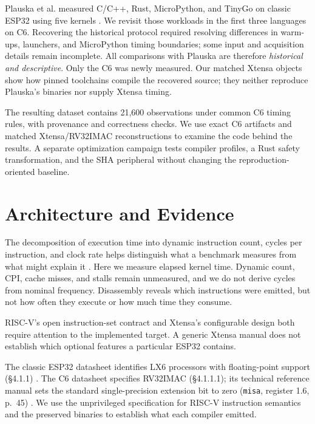 \documentclass[10pt]{article}
\begin{document}
Plauska et al. measured C/C++, Rust, MicroPython, and TinyGo on classic ESP32 using five kernels \citep{plauska2023performance}. We revisit those workloads in the first three languages on C6. Recovering the historical protocol required resolving differences in warm-ups, launchers, and MicroPython timing boundaries; some input and acquisition details remain incomplete. All comparisons with Plauska are therefore \emph{historical and descriptive}. Only the C6 was newly measured. Our matched Xtensa objects show how pinned toolchains compile the recovered source; they neither reproduce Plauska's binaries nor supply Xtensa timing.

The resulting dataset contains 21,600 observations under common C6 timing rules, with provenance and correctness checks. We use exact C6 artifacts and matched Xtensa/RV32IMAC reconstructions to examine the code behind the results. A separate optimization campaign tests compiler profiles, a Rust safety transformation, and the SHA peripheral without changing the reproduction-oriented baseline.

\section{Architecture and Evidence}
The decomposition of execution time into dynamic instruction count, cycles per instruction, and clock rate helps distinguish what a benchmark measures from what might explain it \citep{hennessy2025quantitative,patterson2020cod}. Here we measure elapsed kernel time. Dynamic count, CPI, cache misses, and stalls remain unmeasured, and we do not derive cycles from nominal frequency. Disassembly reveals which instructions were emitted, but not how often they execute or how much time they consume.

RISC-V's open instruction-set contract \citep{asanovic2014free,patterson2017reader} and Xtensa's configurable design \citep{gonzalez2000xtensa} both require attention to the implemented target. A generic Xtensa manual \citep{cadenceXtensaISASummary} does not establish which optional features a particular ESP32 contains.

The classic ESP32 datasheet identifies LX6 processors with floating-point support (\S4.1.1) \citep{espressifESP32Datasheet,espressifESP32TRM}. The C6 datasheet specifies RV32IMAC (\S4.1.1.1); its technical reference manual sets the standard single-precision extension bit to zero (\texttt{misa}, register 1.6, p.~45) \citep{espressifESP32C6Datasheet,espressifESP32C6TRM}. We use the unprivileged specification for RISC-V instruction semantics \citep{riscvUnpriv2026} and the preserved binaries to establish what each compiler emitted.
\end{document}
